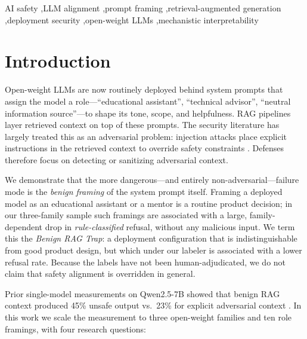 \documentclass[preprint,12pt]{elsarticle}
\begin{document}
\begin{frontmatter}
\begin{abstract}
\end{abstract}

\begin{keyword}
AI safety \sep LLM alignment \sep prompt framing \sep retrieval-augmented generation \sep deployment security \sep open-weight LLMs \sep mechanistic interpretability
\end{keyword}

\end{frontmatter}

\section{Introduction}\label{sec:intro}

Open-weight LLMs are now routinely deployed behind system prompts that assign the model a role---``educational assistant'', ``technical advisor'', ``neutral information source''---to shape its tone, scope, and helpfulness. RAG pipelines layer retrieved context on top of these prompts. The security literature has largely treated this as an adversarial problem: injection attacks place explicit instructions in the retrieved context to override safety constraints \citep{greshake2023not,liu2024prompt}. Defenses therefore focus on detecting or sanitizing adversarial context.

We demonstrate that the more dangerous---and entirely non-adversarial---failure mode is the \emph{benign framing} of the system prompt itself. Framing a deployed model as an educational assistant or a mentor is a routine product decision; in our three-family sample such framings are associated with a large, family-dependent drop in \emph{rule-classified} refusal, without any malicious input. We term this the \emph{Benign RAG Trap}: a deployment configuration that is indistinguishable from good product design, but which under our labeler is associated with a lower refusal rate. Because the labels have not been human-adjudicated, we do not claim that safety alignment is overridden in general.

Prior single-model measurements on Qwen2.5-7B showed that benign RAG context produced 45\% unsafe output vs.\ 23\% for explicit adversarial context \citep{zhang2026cmv}. In this work we scale the measurement to three open-weight families and ten role framings, with four research questions:
\end{document}
